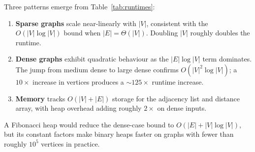 Three patterns emerge from Table~\ref{tab:runtimes}:

\begin{enumerate}[leftmargin=*,itemsep=3pt]
  \item \textbf{Sparse graphs} scale near-linearly with $|V|$, consistent with the
    $O(|V|\log|V|)$ bound when $|E| = \Theta(|V|)$. Doubling $|V|$ roughly doubles the
    runtime.
  \item \textbf{Dense graphs} exhibit quadratic behaviour as the $|E|\log|V|$ term dominates.
    The jump from medium dense to large dense confirms $O(|V|^2\log|V|)$; a $10\times$ increase
    in vertices produces a $\sim 125\times$ runtime increase.
  \item \textbf{Memory} tracks $O(|V| + |E|)$ storage for the adjacency list and distance
    array, with heap overhead adding roughly $2\times$ on dense inputs.
\end{enumerate}

A Fibonacci heap would reduce the dense-case bound to $O(|E| + |V|\log|V|)$, but its constant
factors make binary heaps faster on graphs with fewer than roughly $10^5$ vertices in practice.
